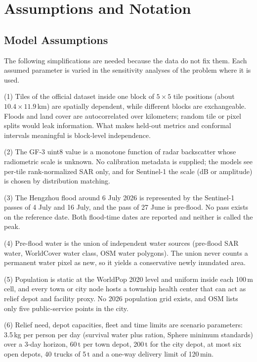 \section[Assumptions]{Assumptions and Notation}

\subsection{Model Assumptions}

The following simplifications are needed because the data do not fix them. Each assumed parameter is varied in the sensitivity analyses of the problem where it is used\cite{deepseek2026,qwen2026,doubao2026}.

(1) Tiles of the official dataset inside one block of $5\times5$ tile positions (about $10.4\times11.9$\,km) are spatially dependent, while different blocks are exchangeable. Floods and land cover are autocorrelated over kilometers; random tile or pixel splits would leak information. What makes held-out metrics and conformal intervals meaningful is block-level independence.

(2) The GF-3 uint8 value is a monotone function of radar backscatter whose radiometric scale is unknown. No calibration metadata is supplied; the models see per-tile rank-normalized SAR only, and for Sentinel-1 the scale (dB or amplitude) is chosen by distribution matching.

(3) The Hengzhou flood around 6 July 2026 is represented by the Sentinel-1 passes of 4 July and 16 July, and the pass of 27 June is pre-flood. No pass exists on the reference date. Both flood-time dates are reported and neither is called the peak.

(4) Pre-flood water is the union of independent water sources (pre-flood SAR water, WorldCover water class, OSM water polygons). The union never counts a permanent water pixel as new, so it yields a conservative newly inundated area.

(5) Population is static at the WorldPop 2020 level and uniform inside each 100\,m cell, and every town or city node hosts a township health center that can act as relief depot and facility proxy. No 2026 population grid exists, and OSM lists only five public-service points in the city.

(6) Relief need, depot capacities, fleet and time limits are scenario parameters: 3.5\,kg per person per day (survival water plus ration, Sphere minimum standards) over a 3-day horizon, 60\,t per town depot, 200\,t for the city depot, at most six open depots, 40 trucks of 5\,t and a one-way delivery limit of 120\,min.


